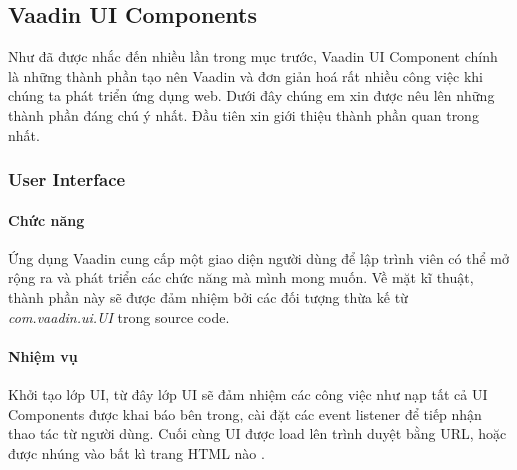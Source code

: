 \subsection{Vaadin UI Components}
Như đã được nhắc đến nhiều lần trong mục trước, Vaadin UI Component chính là những thành phần tạo nên Vaadin và đơn giản hoá rất nhiều công việc khi chúng ta phát triển ứng dụng web. Dưới đây chúng em xin được nêu lên những thành phần đáng chú ý nhất. Đầu tiên xin giới thiệu thành phần quan trong nhất.

\subsubsection{User Interface} 
\paragraph{Chức năng} Ứng dụng Vaadin cung cấp một giao diện người dùng để lập trình viên có thể mở rộng ra và phát triển các chức năng mà mình mong muốn. Về mặt kĩ thuật, thành phần này sẽ được đảm nhiệm bởi các đối tượng thừa kế từ \textit{com.vaadin.ui.UI} trong source code.
\paragraph{Nhiệm vụ} Khởi tạo lớp UI, từ đây lớp UI sẽ đảm nhiệm các công việc như nạp tất cả UI Components được khai báo bên trong, cài đặt các event listener để tiếp nhận thao tác từ người dùng. Cuối cùng UI được load lên trình duyệt bằng URL, hoặc được nhúng 
vào bất kì trang HTML nào \cite{vaadinarchitecture}.


